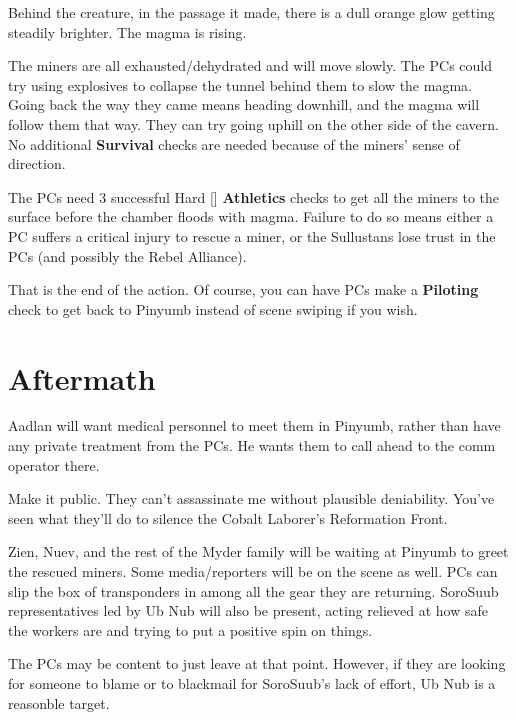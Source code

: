 \documentclass{book}
\newcommand{\df}{\difficulty}
\begin{document}
\begin{multicols*}{2}
Behind the creature, in the passage it made, there is a dull orange glow getting steadily brighter. The magma is rising.

The miners are all exhausted/dehydrated and will move slowly. The PCs could try using explosives to collapse the tunnel behind them to slow the magma. Going back the way they came means heading downhill, and the magma will follow them that way. They can try going uphill on the other side of the cavern.  No additional \textbf{Survival} checks are needed because of the miners' sense of direction.

The PCs need 3 successful Hard [\df\df\df] \textbf{Athletics} checks to get all the miners to the surface before the chamber floods with magma.  Failure to do so means either a PC suffers a critical injury to rescue a miner, or the Sullustans lose trust in the PCs (and possibly the Rebel Alliance).

That is the end of the action. Of course, you can have PCs make a \textbf{Piloting} check to get back to Pinyumb instead of scene swiping if you wish.

\section{Aftermath}

Aadlan will want medical personnel to meet them in Pinyumb, rather than have any private treatment from the PCs. He wants them to call ahead to the comm operator there.
\begin{quoting}
Make it public. They can’t assassinate me without plausible deniability.  You’ve seen what they’ll do to silence the Cobalt Laborer’s Reformation Front.
\end{quoting}

Zien, Nuev, and the rest of the Myder family will be waiting at Pinyumb to greet the rescued miners. Some media/reporters will be on the scene as well. PCs can slip the box of transponders in among all the gear they are returning. SoroSuub representatives led by Ub Nub will also be present, acting relieved at how safe the workers are and trying to put a positive spin on things.

The PCs may be content to just leave at that point. However, if they are looking for someone to blame or to blackmail for SoroSuub's lack of effort, Ub Nub is a reasonble target.

\vfill\null
\columnbreak


\end{multicols*}
\end{document}

